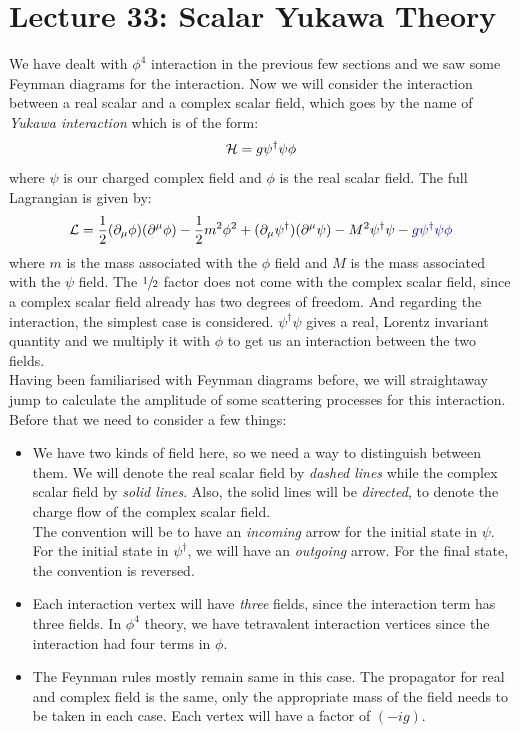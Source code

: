 \section*{Lecture 33: Scalar Yukawa Theory}
We have dealt with $\phi^4$ interaction in the previous few sections and we saw some Feynman diagrams for the interaction. Now we will consider the interaction between a real scalar and a complex scalar field, which goes by the name of \textit{Yukawa interaction} which is of the form:
$$\mathcal H = g \psi^\dagger \psi  \phi$$
where $\psi$ is our charged complex field and $\phi$ is the real scalar field. The full Lagrangian is given by:
$$\SL = \frac{1}{2}(\partial_\mu \phi)(\partial^\mu \phi) -\frac{1}{2}m^2\phi^2 +(\partial_\mu \psi^\dagger)(\partial^\mu \psi)-M^2\psi^\dagger\psi - \mathcolor{blue}{g\psi^\dagger\psi \phi}$$
where $m$ is the mass associated with the $\phi$ field and $M$ is the mass associated with the $\psi$ field. The $\sfrac{1}{2}$ factor does not come with the complex scalar field, since a complex scalar field already has two degrees of freedom. And regarding the interaction, the simplest case is considered. $\psi^\dagger\psi$ gives a real, Lorentz invariant quantity and we multiply it with $\phi$ to get us an interaction between the two fields. \\[0.2cm]
Having been familiarised with Feynman diagrams before, we will straightaway jump to calculate the amplitude of some scattering processes for this interaction. Before that we need to consider a few things:
\begin{itemize}
    \item We have two kinds of field here, so we need a way to distinguish between them. We will denote the real scalar field by \textit{dashed lines} while the complex scalar field by \textit{solid lines}. Also, the solid lines will be \textit{directed}, to denote the charge flow of the complex scalar field.\\[0.2cm] The convention will be to have an \textit{incoming} arrow for the initial state in $\psi$. For the initial state in $\psi^\dagger$, we will have an \textit{outgoing} arrow. For the final state, the convention is reversed. 
    \item Each interaction vertex will have \textit{three} fields, since the interaction term has three fields. In $\phi^4$ theory, we have tetravalent interaction vertices since the interaction had four terms in $\phi$. 
    \item The Feynman rules mostly remain same in this case. The propagator for real and complex field is the same, only the appropriate mass of the field needs to be taken in each case. Each vertex will have a factor of $(-ig)$. 
\end{itemize}
